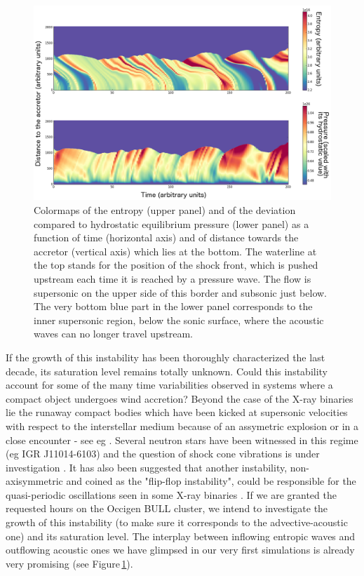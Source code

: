 \documentclass[
    a4paper, 
    12pt, onecolumn,
]{article}
\begin{document}
\begin{figure}
\begin{center}
\includegraphics[width=12cm]{waves.png}
\caption{Colormaps of the entropy (upper panel) and of the deviation compared to hydrostatic equilibrium pressure (lower panel) as a function of time (horizontal axis) and of distance towards the accretor (vertical axis) which lies at the bottom. The waterline at the top stands for the position of the shock front, which is pushed upstream each time it is reached by a pressure wave. The flow is supersonic on the upper side of this border and subsonic just below. The very bottom blue part in the lower panel corresponds to the inner supersonic region, below the sonic surface, where the acoustic waves can no longer travel upstream.}
\label{fig:waves}
\end{center}
\end{figure} 
\indent If the growth of this instability has been thoroughly characterized the last decade, its saturation level remains totally unknown. Could this instability account for some of the many time variabilities observed in systems where a compact object undergoes wind accretion? Beyond the case of the X-ray binaries lie the runaway compact bodies which have been kicked at supersonic velocities with respect to the interstellar medium because of an assymetric explosion or in a close encounter - see eg \cite{Sperhake2011}. Several neutron stars have been witnessed in this regime (eg IGR J11014-6103) and the question of shock cone vibrations is under investigation \citep{Lora-Clavijo2013}. It has also been suggested that another instability, non-axisymmetric and coined as the "flip-flop instability", could be responsible for the quasi-periodic oscillations seen in some X-ray binaries \citep{Donmez2011}. If we are granted the requested hours on the Occigen BULL cluster, we intend to investigate the growth of this instability (to make sure it corresponds to the advective-acoustic one) and its saturation level. The interplay between inflowing entropic waves and outflowing acoustic ones we have glimpsed in our very first simulations is already very promising (see Figure\,\ref{fig:waves}).
\end{document}
